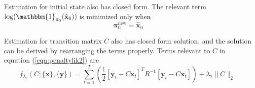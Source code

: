 \documentclass[fleqn]{article}
\let\oldref\ref
\renewcommand{\ref}[1]{(\oldref{#1})}
\newcommand{\T}{T}
\begin{document}
Estimation for initial state also has closed form. The relevant term $\log(\mathbbm{1}_{\mathbf{\pi}_0}(\hat{\mathbf{x}}_0))$ is minimized only when
\begin{equation*}\label{eq:updatepi}
\mathbf{\pi}_0^{\text{new}} = \hat{\mathbf{x}}_0
\end{equation*}

Estimation for transition matrix $C$ also has closed form solution, and the solution can be derived by rearranging the terms properly. Terms relevant to $C$ in equation \ref{eqn:penaltylik2} are
\begin{equation}\label{eq:penaltylik1}
f_{\lambda_2}(C;\{\mathbf{x}\},\{\mathbf{y}\}) = \sum\limits_{t=1}^{T}\left(\frac{1}{2}[\mathbf{y}_t-C\mathbf{x}_t]^{\T}R^{-1}[\mathbf{y}_t-C\mathbf{x}_t]\right)+\lambda_2 \|C\|_2.
\end{equation}
\end{document}

